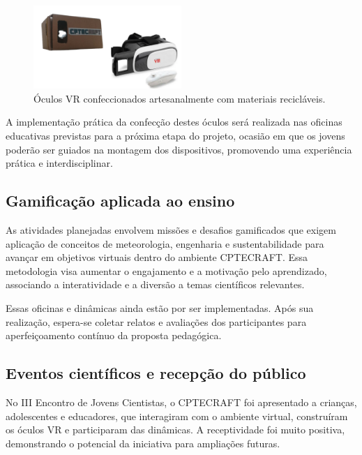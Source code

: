 \begin{figure}[H]
    \centering
    \includegraphics[width=0.5\textwidth]{docs/figuras/Imagem2.png}
    \caption{Óculos VR confeccionados artesanalmente com materiais recicláveis.}
    \label{fig:oculos_vr}
\end{figure}

A implementação prática da confecção destes óculos será realizada nas oficinas educativas previstas para a próxima etapa do projeto, ocasião em que os jovens poderão ser guiados na montagem dos dispositivos, promovendo uma experiência prática e interdisciplinar.

\subsection{Gamificação aplicada ao ensino}

As atividades planejadas envolvem missões e desafios gamificados que exigem aplicação de conceitos de meteorologia, engenharia e sustentabilidade para avançar em objetivos virtuais dentro do ambiente CPTECRAFT. Essa metodologia visa aumentar o engajamento e a motivação pelo aprendizado, associando a interatividade e a diversão a temas científicos relevantes.

Essas oficinas e dinâmicas ainda estão por ser implementadas. Após sua realização, espera-se coletar relatos e avaliações dos participantes para aperfeiçoamento contínuo da proposta pedagógica.

\subsection{Eventos científicos e recepção do público}

No III Encontro de Jovens Cientistas, o CPTECRAFT foi apresentado a crianças, adolescentes e educadores, que interagiram com o ambiente virtual, construíram os óculos VR e participaram das dinâmicas. A receptividade foi muito positiva, demonstrando o potencial da iniciativa para ampliações futuras.


